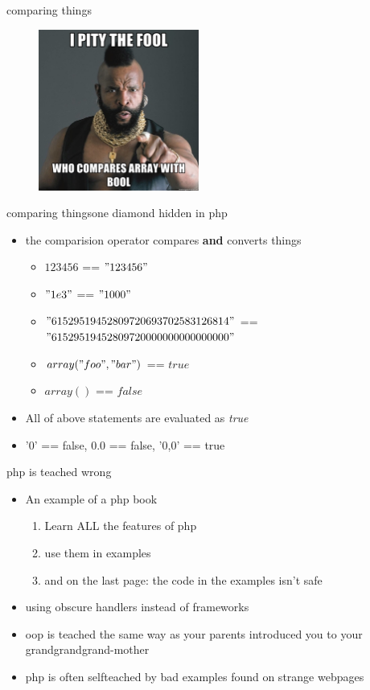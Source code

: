 \documentclass[final]{beamer}
\begin{document}
\begin{frame}{comparing things}
\begin{center}
\begin{figure}[ht]
  \centering
	\includegraphics[height=200px]{./../graph/Meme/Mr_T.jpg}
\end{figure}
\end{center}
\end{frame}


\begin{frame}{comparing things}{one diamond hidden in php}
\begin{itemize}
	\item the comparision operator compares \textbf{and} converts things
	\begin{itemize}
		\item $123456$ == $" 123456"$
		\item $"1e3"$ == $"1000"$
		\item $"61529519452809720693702583126814"$   ==  $"61529519452809720000000000000000"$
		\item $array("foo","bar")$ == $true$
		\item $array()$ == $false$
	\end{itemize}
	\item All of above statements are evaluated as \textit{true} 
	\item '0' == false, 0.0 == false, '0,0' == true
\end{itemize}
\end{frame}


\begin{frame}{php is teached wrong}
\begin{itemize}
	\item An example of a php book
	\begin{enumerate}
		\item Learn ALL the features of php
		\item use them in examples
		\item and on the last page: the code in the examples isn't safe
	\end{enumerate}
	\item using obscure handlers instead of frameworks
	\item oop is teached the same way as your parents introduced you to your grandgrandgrand-mother
	\item php is often selfteached by bad examples found on strange webpages
\end{itemize}
\end{frame}
\end{document}
